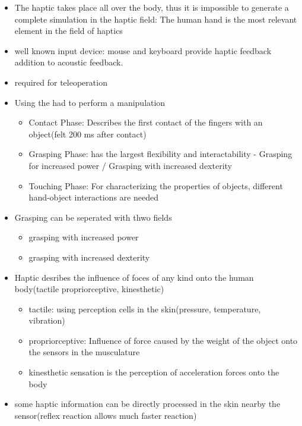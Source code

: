 \documentclass{standalone}
\begin{document}
\begin{itemize}
	\item The haptic takes place all over the body, thus it is impossible to generate a complete simulation in the haptic field: The human hand is the most relevant element in the field of haptics
	\item well known input device: mouse and keyboard provide haptic feedback addition to acoustic feedback.
	\item required for teleoperation
	\item Using the had to perform a manipulation
	\begin{itemize}
		\item Contact Phase: Describes the first contact of the fingers with an object(felt 200 ms after contact)
		\item Grasping Phase: has the largest flexibility and interactability
		- Grasping for increased power / Grasping with increased dexterity
		\item Touching Phase: For characterizing the properties of objects, different hand-object interactions are needed
	\end{itemize}
	\item Grasping can be seperated with thwo fields
	\begin{itemize}
		\item grasping with increased power
		\item grasping with increased dexterity
	\end{itemize}
	\item Haptic desribes the influence of foces of any kind onto the human body(tactile propriorceptive, kinesthetic)
	\begin{itemize}
		\item tactile: using perception cells in the skin(pressure, temperature, vibration)
		\item propriorceptive: Influence of force caused by the weight of the object onto the sensors in the musculature
		\item kinesthetic sensation is the perception of acceleration forces onto the body 
	\end{itemize}
	\item some haptic information can be directly processed in the skin nearby the sensor(reflex reaction allows much faster reaction)
\end{itemize}
\end{document}
